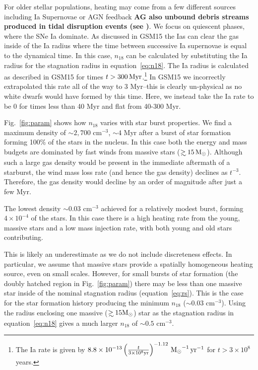 \documentclass[usenatbib,fleqn]{mnras}
\newcommand\gsim{\mathrel{\rlap{\lower4pt\hbox{\hskip1pt$\sim$}}
    \raise1pt\hbox{$>$}}}
\newcommand{\Msun}{{\rm M_\odot}}
\begin{document}
For older stellar populations, heating may come from a few different
sources including Ia Supernovae or AGN feedback {\bf AG also unbound
  debris streams produced in tidal disruption events (see
  \citep{Guillochon+2015a})}. We focus on quiescent phases, where the
SNe Ia dominate. As discussed in GSM15 the Ias can clear the gas
inside of the Ia radius where the time between successive Ia
supernovae is equal to the dynamical time. In this case, $n_{18}$ can
be calculated by substituting the Ia radius for the stagnation radius
in equation~\eqref{eq:n18}. The Ia radius is calculated as described
in GSM15 for times $t>300 \,{\rm Myr}$.\footnote{The Ia rate is given
  by $8.8 \times 10^{-13} \left(\frac{t}{3\times 10^{8} {\rm
        yr}}\right)^{-1.12} \, \Msun^{-1} \, {\rm yr}^{-1} $ for
  $t>3\times 10^8$ years.} In GSM15 we incorrectly extrapolated this
rate all of the way to 3 Myr--this is clearly un-physical as no white
dwarfs would have formed by this time. Here, we instead take the Ia
rate to be 0 for times less than 40 Myr and flat from 40-300 Myr.

Fig.~\ref{fig:param} shows how $n_{18}$ varies with star burst
properties.  We find a maximum density of $\sim 2,700$ cm$^{-3}$,
$\sim 4$ Myr after a burst of star formation forming 100\% of the
stars in the nucleus. In this case both the energy and mass budgets
are dominated by fast winds from massive stars ($\gsim 15 \, \Msun$).
Although such a large gas density would be present in the immediate
aftermath of a starburst, the wind mass loss rate (and hence the gas
density) declines as $t^{-3}$. Therefore, the gas density would
decline by an order of magnitude after just a few Myr.

The lowest density $\sim 0.03$ cm$^{-3}$ achieved for a relatively
modest burst, forming $4\times 10^{-4}$ of the stars. In this case
there is a high heating rate from the young, massive stars and a low mass
injection rate, with both young and old stars contributing.

This is likely an underestimate as we do not include discreteness
effects. In particular, we assume that massive stars provide a
spatially homogeneous heating source, even on small scales. However,
for small bursts of star formation (the doubly hatched region in
Fig.~\ref{fig:param}) there may be less than one massive star inside
of the nominal stagnation radius (equation~\ref{eq:rs}). This is the
case for the star formation history producing the minimum $n_{18}$
($\sim 0.03$ cm$^{-3}$). Using the radius enclosing one massive
($\gsim 15 \Msun$) star as the stagnation radius in
equation~\eqref{eq:n18} gives a much larger $n_{18}$ of $\sim 0.5$
cm$^{-3}$.
\end{document}
